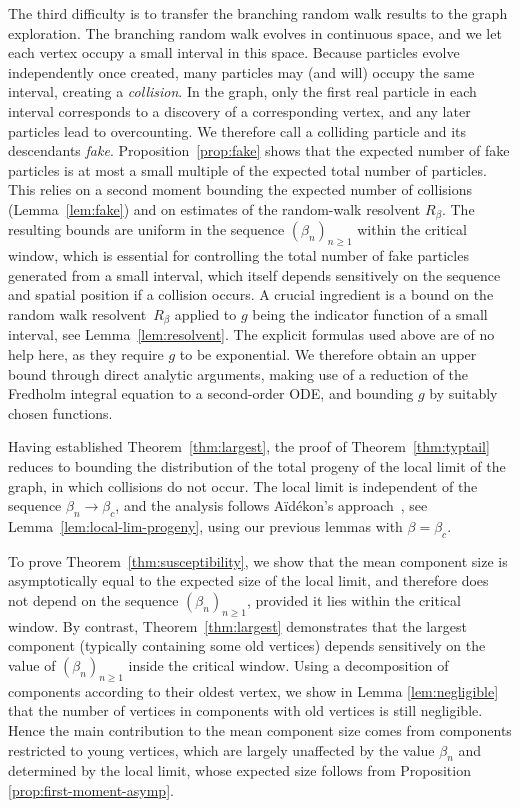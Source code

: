 \documentclass[a4paper, a4wide, 10pt, reqno]{amsart}
\theoremstyle{plain}
\theoremstyle{definition}
\numberwithin{equation}{section}
\begin{document}
The third difficulty is to transfer the branching random walk results to the graph exploration.
The branching random walk evolves in continuous space, and we let  each vertex occupy a small interval in this space. Because particles evolve independently once created, many particles may (and will) occupy the same interval, creating a \emph{collision}. In the graph, only the first real particle in each interval corresponds to a discovery of a corresponding vertex, and any later particles lead to overcounting. We therefore call a colliding particle and its descendants \emph{fake}.
Proposition~\ref{prop:fake} shows that the expected number of fake particles is at most a small multiple of the expected total number of particles. This relies on a second moment bounding the expected number of collisions (Lemma~\ref{lem:fake}) and on estimates of the random-walk resolvent $R_\beta$. The resulting bounds are uniform in the sequence $(\beta_n)_{n\ge 1}$ within the critical window, which is essential for controlling the total number of fake particles generated from a small interval, which itself depends sensitively on the sequence and spatial position if a collision occurs.
A crucial ingredient is a bound on the  random walk resolvent~$R_\beta$ applied to $g$ being the indicator function of a small interval, see Lemma~\ref{lem:resolvent}. The explicit formulas used above are of no help here, as they require $g$ to be  exponential. We therefore obtain an upper bound through direct analytic arguments, making use of a reduction of the Fredholm integral equation to a second-order ODE, and bounding $g$ by suitably chosen functions. 
\smallskip

\pagebreak[3]
Having established Theorem~\ref{thm:largest}, the proof of Theorem~\ref{thm:typtail} reduces to bounding the distribution of the total progeny of the local limit of the graph, in which collisions do not occur. The local limit is independent of the sequence $\beta_n\to\beta_c$, and the analysis follows Aïdékon's approach~\cite{aidekon2010tail}, see Lemma~\ref{lem:local-lim-progeny}, using our previous lemmas with $\beta=\beta_c$.
\smallskip 

\pagebreak[3]

To prove Theorem~\ref{thm:susceptibility}, we show that the mean component size is asymptotically equal to the expected size of the local limit, and therefore does not depend on the sequence $(\beta_n)_{n\ge 1}$, provided it lies within the critical window. By contrast, Theorem~\ref{thm:largest} demonstrates that the largest component (typically containing some old vertices) depends sensitively on the value of $(\beta_n)_{n\ge 1}$ inside the critical window. Using a decomposition of components according to their oldest vertex, we show in Lemma \ref{lem:negligible} that the number of vertices in components with old vertices is still negligible. Hence the main contribution to the mean component size comes from components restricted to young vertices, which are largely unaffected by the value $\beta_n$ and determined by the local limit, whose expected size follows from Proposition \ref{prop:first-moment-asymp}.
\pagebreak[3]
\end{document}
